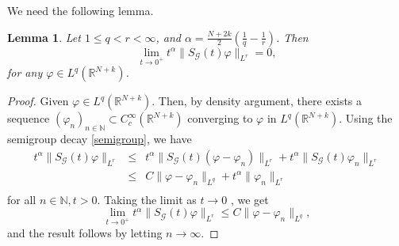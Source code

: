 \documentclass[a4,psfig,english,12pt,epsf,portrait]{article}
\newtheorem{lemma}[theorem]{Lemma}
\numberwithin{equation}{section}
\def\R{{\mathbb {R}}}
\def\R{\mathbb{R}}
\def\N{\mathbb{N}}
\begin{document}
We need the following lemma.
\begin{lemma}\label{lemmaSg}
	Let $1\leq q<r<\infty$, and $\alpha = \frac{N+2k}{2}\left(\frac{1}{q} - \frac{1}{r}\right)$. Then
	\begin{equation}
		\lim\limits_{t\rightarrow 0^+}t^{\alpha}\|S_\mathcal{G}(t)\varphi\|_{L^r}=0,
	\end{equation}
	for any $\varphi\in L^q(\R^{N+k})$.
\end{lemma}


\begin{proof} Given $\varphi \in L^q(\R^{N+k})$. Then, by density argument, there exists a sequence $(\varphi_n)_{n \in \N}\subset C_c^\infty(\R^{N+k})$ converging to $\varphi$ in $L^q(\R^{N+k})$. Using the semigroup decay \eqref{semigroup}, we have
	\begin{eqnarray*}
		t^\alpha\|S_\mathcal{G}(t)\varphi\|_{L^r}&\leq& t^\alpha\|S_\mathcal{G}(t)(\varphi-\varphi_n)\|_{L^r}+t^\alpha\|S_\mathcal{G}(t)\varphi_n\|_{L^r}\\
		&\leq&C\|\varphi-\varphi_n\|_{L^q}+t^\alpha\|\varphi_n\|_{L^r}\\
	\end{eqnarray*}
	for all $n\in \N, t>0$.
	Taking the limit as $t \rightarrow 0$ , we get
	\begin{equation*}
		\lim\limits_{t\rightarrow 0^+}t^{\alpha}\|S_\mathcal{G}(t)\varphi\|_{L^r}\leq C\|\varphi-\varphi_n\|_{L^q},
	\end{equation*}
	and the result follows by letting $n \rightarrow \infty$.
\end{proof}
\end{document}

